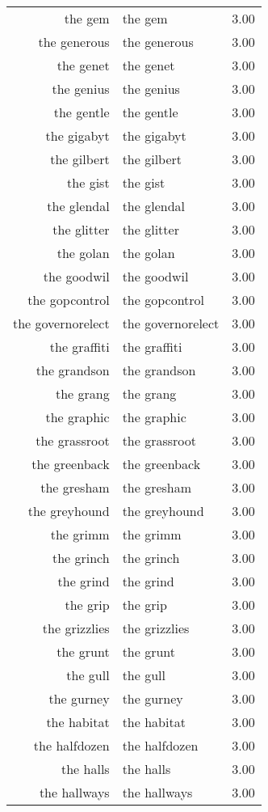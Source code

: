 \begin{table}[ht]
\begin{tabular}{rlr}
  the gem & the gem & 3.00 \\ 
  the generous & the generous & 3.00 \\ 
  the genet & the genet & 3.00 \\ 
  the genius & the genius & 3.00 \\ 
  the gentle & the gentle & 3.00 \\ 
  the gigabyt & the gigabyt & 3.00 \\ 
  the gilbert & the gilbert & 3.00 \\ 
  the gist & the gist & 3.00 \\ 
  the glendal & the glendal & 3.00 \\ 
  the glitter & the glitter & 3.00 \\ 
  the golan & the golan & 3.00 \\ 
  the goodwil & the goodwil & 3.00 \\ 
  the gopcontrol & the gopcontrol & 3.00 \\ 
  the governorelect & the governorelect & 3.00 \\ 
  the graffiti & the graffiti & 3.00 \\ 
  the grandson & the grandson & 3.00 \\ 
  the grang & the grang & 3.00 \\ 
  the graphic & the graphic & 3.00 \\ 
  the grassroot & the grassroot & 3.00 \\ 
  the greenback & the greenback & 3.00 \\ 
  the gresham & the gresham & 3.00 \\ 
  the greyhound & the greyhound & 3.00 \\ 
  the grimm & the grimm & 3.00 \\ 
  the grinch & the grinch & 3.00 \\ 
  the grind & the grind & 3.00 \\ 
  the grip & the grip & 3.00 \\ 
  the grizzlies & the grizzlies & 3.00 \\ 
  the grunt & the grunt & 3.00 \\ 
  the gull & the gull & 3.00 \\ 
  the gurney & the gurney & 3.00 \\ 
  the habitat & the habitat & 3.00 \\ 
  the halfdozen & the halfdozen & 3.00 \\ 
  the halls & the halls & 3.00 \\ 
  the hallways & the hallways & 3.00 \\ 

\end{tabular}
\end{table}
